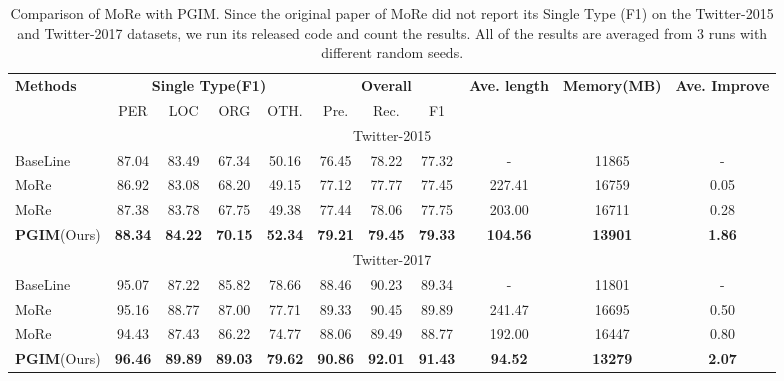 \documentclass[11pt]{article}
\begin{document}
\begin{table*}[!]
\small
\setlength\tabcolsep{5pt}
\renewcommand{\arraystretch}{1.2}
\centering
\begin{tabular}{lcccc|ccc|c|c|c}
\toprule
 \multirow{2}{*}{\textbf{Methods}} 
 & \multicolumn{4}{|c|}{\textbf{Single Type(F1)}} & \multicolumn{3}{c|}{\textbf{Overall}} & \multirow{2}{*}{\textbf{Ave. length}}  &\multirow{2}{*}{\textbf{Memory(MB)}} &\multirow{2}{*}{\textbf{Ave. Improve}} \\
  &\multicolumn{1}{|c}{PER}   & LOC   & ORG  & \multicolumn{1}{c|}{OTH.}  & Pre.   & Rec.   & \multicolumn{1}{c|}{F1}  &&  \\ 
\midrule 
 \multicolumn{11}{c}{Twitter-2015}\\
\midrule
BaseLine &\multicolumn{1}{|c}{87.04} & 83.49 & 67.34 & \multicolumn{1}{c|}{50.16} & 76.45 & 78.22 & \multicolumn{1}{c|}{77.32} & - & 11865 & - \\\midrule
MoRe &\multicolumn{1}{|c}{86.92} & 83.08 & 68.20 & \multicolumn{1}{c|}{49.15} & 77.12 & 77.77 & \multicolumn{1}{c|}{77.45} & 227.41 & 16759 &  0.05  \\
MoRe &\multicolumn{1}{|c}{87.38} & 83.78 & 67.75 & \multicolumn{1}{c|}{49.38} & 77.44 & 78.06 & \multicolumn{1}{c|}{77.75} & 203.00 & 16711 &  0.28 \\
\textbf{PGIM}(Ours)  &\multicolumn{1}{|c}{\textbf{88.34}} & \textbf{84.22} & \textbf{70.15} & \multicolumn{1}{c|}{\textbf{52.34}} & \textbf{79.21} & \textbf{79.45} & \multicolumn{1}{c|}{\textbf{79.33}} & \textbf{104.56} & \textbf{13901} & \textbf{ 1.86} \\
\midrule 
\multicolumn{11}{c}{Twitter-2017}\\
\midrule
BaseLine &\multicolumn{1}{|c}{95.07} & 87.22 & 85.82 & \multicolumn{1}{c|}{78.66} & 88.46  & 90.23 &  \multicolumn{1}{c|}{89.34} & - & 11801 & -  \\\midrule
MoRe &\multicolumn{1}{|c}{95.16} & 88.77 & 87.00 & \multicolumn{1}{c|}{77.71} & 89.33 & 90.45 & \multicolumn{1}{c|}{89.89} & 241.47 & 16695 &  0.50 \\
MoRe &\multicolumn{1}{|c}{94.43} & 87.43 & 86.22 & \multicolumn{1}{c|}{74.77} & 88.06 & 89.49 & \multicolumn{1}{c|}{88.77} & 192.00 & 16447 &  0.80 \\
\textbf{PGIM}(Ours)  &\multicolumn{1}{|c}{\textbf{96.46}} & \textbf{89.89} & \textbf{89.03} & \multicolumn{1}{c|}{\textbf{79.62}} & \textbf{90.86} & \textbf{92.01} & \multicolumn{1}{c|}{\textbf{91.43}} & \textbf{94.52} & \textbf{13279}  & \textbf{ 2.07}\\

\bottomrule
\end{tabular}
\caption{Comparison of MoRe with PGIM. Since the original paper of MoRe \citep{wang2022named} did not report its Single Type (F1) on the Twitter-2015 and Twitter-2017 datasets, we run its released code and count the results. All of the results are averaged from 3 runs with different random seeds. }
\label{tab:PGIM&MORE}
\end{table*}
\end{document}
